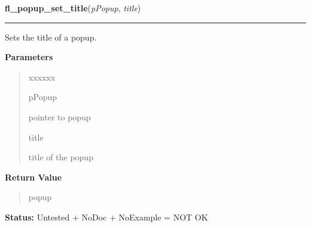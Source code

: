 \hspace{.8\funcindent}\begin{boxedminipage}{\funcwidth}

    \raggedright \textbf{fl\_popup\_set\_title}(\textit{pPopup}, \textit{title})

    \vspace{-1.5ex}

    \rule{\textwidth}{0.5\fboxrule}
\setlength{\parskip}{2ex}
    Sets the title of a popup.

\setlength{\parskip}{1ex}
      \textbf{Parameters}
      \vspace{-1ex}

      \begin{quote}
        \begin{Ventry}{xxxxxx}

          \item[pPopup]

          pointer to popup

          \item[title]

          title of the popup

        \end{Ventry}

      \end{quote}

      \textbf{Return Value}
    \vspace{-1ex}

      \begin{quote}
      popup

      \end{quote}

\textbf{Status:} Untested + NoDoc + NoExample = NOT OK



    \end{boxedminipage}

    \label{xformslib:library:fl_popup_entry_set_callback}

    \vspace{0.5ex}

